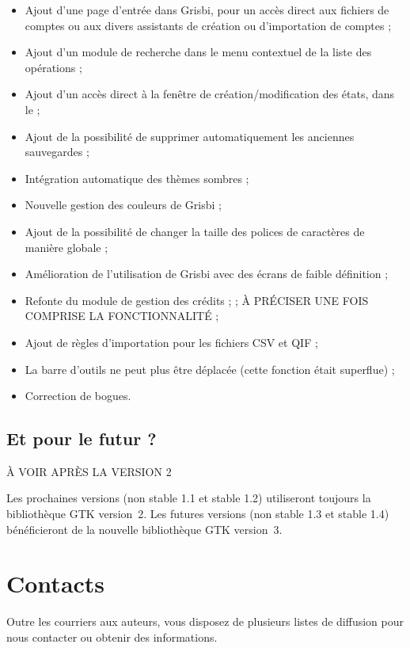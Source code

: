 \begin{itemize}

	\item Ajout d'une page d'entrée dans Grisbi, pour un accès direct aux fichiers de comptes ou aux divers assistants de création  ou d'importation de comptes ;
	\item Ajout d'un module de recherche dans le menu contextuel de la liste des opérations ;
	\item Ajout d'un accès direct à la fenêtre de création/modification des états, dans le   ;
	\item Ajout de la possibilité de supprimer automatiquement les anciennes sauvegardes ;
	\item Intégration automatique des thèmes sombres ;
	\item Nouvelle gestion des couleurs de Grisbi ;
	\item Ajout de la possibilité de changer la taille des polices de caractères de manière globale ;
	\item Amélioration de l'utilisation de Grisbi avec des écrans de faible définition ;
	\item Refonte du module de gestion des crédits ;
; À PRÉCISER UNE FOIS COMPRISE LA FONCTIONNALITÉ ;
	\item Ajout de règles d'importation pour les fichiers CSV et QIF ;
	\item La barre d'outils ne peut plus être déplacée (cette fonction était superflue) ;
	\item Correction de bogues.
	 
\end{itemize}




\subsection{Et pour le futur ?} À VOIR APRÈS LA VERSION 2

Les prochaines versions (non stable 1.1 et stable 1.2) utiliseront toujours la bibliothèque \gls{GTK} version~2.
Les futures versions (non stable 1.3 et stable 1.4) bénéficieront de la nouvelle  bibliothèque GTK version~3.


\section{Contacts\label{introduction-contacts}}


Outre les courriers aux auteurs, vous disposez de plusieurs listes de diffusion 
pour nous contacter ou obtenir des informations.

